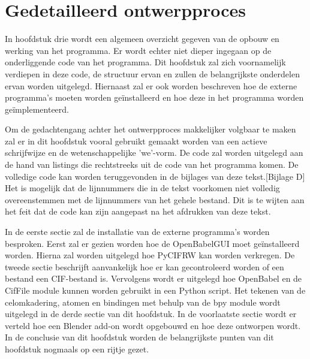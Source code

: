 

\chapter{Gedetailleerd ontwerpproces}

In hoofdstuk drie wordt een algemeen overzicht gegeven van de opbouw en werking van het programma. Er wordt echter niet dieper ingegaan op de onderliggende code van het programma. Dit hoofdstuk zal zich voornamelijk verdiepen in deze code, de structuur ervan en zullen de belangrijkste onderdelen ervan worden uitgelegd. Hiernaast zal er ook worden beschreven hoe de externe programma's moeten worden geïnstalleerd en hoe deze in het programma worden geïmplementeerd. 
\par
Om de gedachtengang achter het ontwerpproces makkelijker volgbaar te maken zal er in dit hoofdstuk vooral gebruikt gemaakt worden van een actieve schrijfwijze en de wetenschappelijke 'we'-vorm. De code zal worden uitgelegd aan de hand van listings die rechtstreeks uit de code van het programma komen. De volledige code kan worden teruggevonden in de bijlages van deze tekst.[Bijlage D] Het is mogelijk dat de lijnnummers die in de tekst voorkomen niet volledig overeenstemmen met de lijnnummers van het gehele bestand. Dit is te wijten aan het feit dat de code kan zijn aangepast na het afdrukken van deze tekst.
\par
In de eerste sectie zal de installatie van de externe programma's worden besproken. Eerst zal er gezien worden hoe de OpenBabelGUI moet geïnstalleerd worden. Hierna zal worden uitgelegd hoe PyCIFRW kan worden verkregen. De tweede sectie beschrijft aanvankelijk hoe er kan gecontroleerd worden of een bestand een CIF-bestand is. Vervolgens wordt er uitgelegd hoe OpenBabel en de CifFile module kunnen worden gebruikt in een Python script. Het tekenen van de celomkadering, atomen en bindingen met behulp van de bpy module wordt uitgelegd in de derde sectie van dit hoofdstuk. In de voorlaatste sectie wordt er verteld hoe een Blender add-on wordt opgebouwd en hoe deze ontworpen wordt. In de conclusie van dit hoofdstuk worden de belangrijkste punten van dit hoofdstuk nogmaals op een rijtje gezet.   

